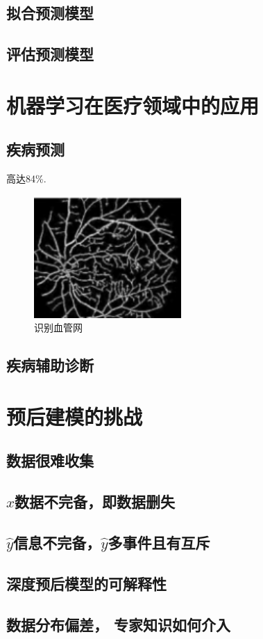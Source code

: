 \documentclass{article}
\begin{document}
    \subsection{拟合预测模型}
    
    \subsection{评估预测模型}
    
    
\section{机器学习在医疗领域中的应用}

    \subsection{疾病预测}
        高达84\%\cite{伍亚舟2022人工智能在临床领域的研究进展及前景展望}. 
    \begin{figure}[h]
        \centering
        \includegraphics[width=0.5\textwidth]{2fig/b.png}
        \caption{识别血管网}
        \label{fig:b}
    \end{figure}
        
    \subsection{疾病辅助诊断}
    

\section{预后建模的挑战}
    \subsection{数据很难收集}

    \subsection{$x$数据不完备，即数据删失}

    \subsection{$\hat{y} $信息不完备，$\hat{y} $多事件且有互斥}

    \subsection{深度预后模型的可解释性}

    \subsection{数据分布偏差， 专家知识如何介入}
\newpage




\end{document}
